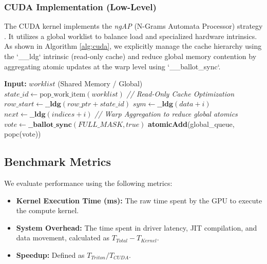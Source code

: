 \subsubsection{CUDA Implementation (Low-Level)}
The CUDA kernel implements the \textit{ngAP} (N-Grams Automata Processor) strategy \cite{ngap}. It utilizes a global worklist to balance load and specialized hardware intrinsics.
As shown in Algorithm \ref{alg:cuda}, we explicitly manage the cache hierarchy using the `\_\_ldg` intrinsic (read-only cache) and reduce global memory contention by aggregating atomic updates at the warp level using `\_\_ballot\_sync`.

\begin{algorithm}[h]
\caption{CUDA ngAP Kernel Logic (Optimized)}
\label{alg:cuda}
\begin{algorithmic}[1]
\STATE \textbf{Input:} $worklist$ (Shared Memory / Global)
\STATE $state\_id \leftarrow \text{pop\_work\_item}(worklist)$
\STATE \textit{// Read-Only Cache Optimization}
\STATE $row\_start \leftarrow \textbf{\_\_ldg}(row\_ptr + state\_id)$
\STATE {}
    \STATE $sym \leftarrow \textbf{\_\_ldg}(data + i)$
        \STATE $next \leftarrow \textbf{\_\_ldg}(indices + i)$
        \STATE \textit{// Warp Aggregation to reduce global atomics}
        \STATE $vote \leftarrow \textbf{\_\_ballot\_sync}(FULL\_MASK, true)$
            \STATE \textbf{atomicAdd}(global\_queue, popc(vote))
        \ENDIF
    \ENDIF
\ENDFOR
\end{algorithmic}
\end{algorithm}

\subsection{Benchmark Metrics}
We evaluate performance using the following metrics:
\begin{itemize}
    \item \textbf{Kernel Execution Time (ms):} The raw time spent by the GPU to execute the compute kernel.
    \item \textbf{System Overhead:} The time spent in driver latency, JIT compilation, and data movement, calculated as $T_{Total} - T_{Kernel}$.
    \item \textbf{Speedup:} Defined as $T_{Triton} / T_{CUDA}$.
\end{itemize}
